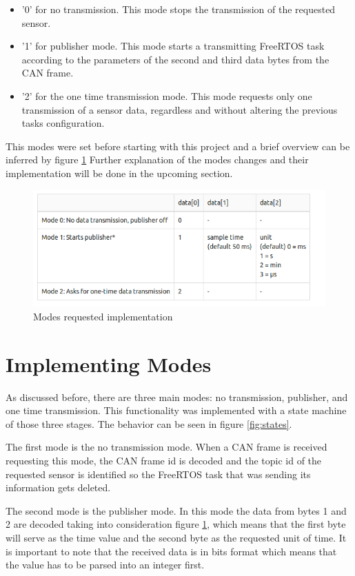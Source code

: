 \documentclass[12pt]{report}%
\begin{document}
\begin{itemize}
\item '0' for no transmission. This mode stops the transmission of the requested sensor.
\item '1' for publisher mode. This mode starts a transmitting FreeRTOS task according to the parameters of the second and third data bytes from the CAN frame.
\item '2' for the one time transmission mode. This mode requests only one transmission of a sensor data, regardless and without altering the previous tasks configuration.
\end{itemize}
This modes were set before starting with this project and a brief overview can be inferred by figure \ref{fig:canmodes}
Further explanation of the modes changes and their implementation will be done in the upcoming section.
\begin{figure}[ht]
	\centering
	\includegraphics[width=\textwidth]{modes}
    \caption{Modes requested implementation}
    \label{fig:canmodes}
\end{figure}

\section{Implementing Modes}
As discussed before, there are three main modes: no transmission, publisher, and one time transmission. This functionality was implemented with a state machine of those three stages. The behavior can be seen in figure \ref{fig:states}.

The first mode is the no transmission mode. When a CAN frame is received requesting this mode, the CAN frame id is decoded and the topic id of the requested sensor is identified so the FreeRTOS task that was sending its information gets deleted.

The second mode is the publisher mode. In this mode the data from bytes 1 and 2 are decoded taking into consideration figure \ref{fig:canmodes}, which means that the first byte will serve as the time value and the second byte as the requested unit of time. It is important to note that the received data is in bits format which means that the value has to be parsed into an integer first.
\end{document}
